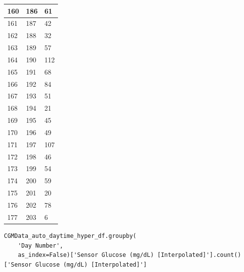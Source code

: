 \begin{tabular}{p{}p{}p{}}
160 & 186 & 61 \\
\hline
161 & 187 & 42 \\
\hline
162 & 188 & 32 \\
\hline
163 & 189 & 57 \\
\hline
164 & 190 & 112 \\
\hline
165 & 191 & 68 \\
\hline
166 & 192 & 84 \\
\hline
167 & 193 & 51 \\
\hline
168 & 194 & 21 \\
\hline
169 & 195 & 45 \\
\hline
170 & 196 & 49 \\
\hline
171 & 197 & 107 \\
\hline
172 & 198 & 46 \\
\hline
173 & 199 & 54 \\
\hline
174 & 200 & 59 \\
\hline
175 & 201 & 20 \\
\hline
176 & 202 & 78 \\
\hline
177 & 203 & 6 \\
\hline
\bottomrule
\end{tabular}

\bigskip

\begin{verbatim}
CGMData_auto_daytime_hyper_df.groupby(
    'Day Number', 
    as_index=False)['Sensor Glucose (mg/dL) [Interpolated]'].count()['Sensor Glucose (mg/dL) [Interpolated]']
\end{verbatim}

